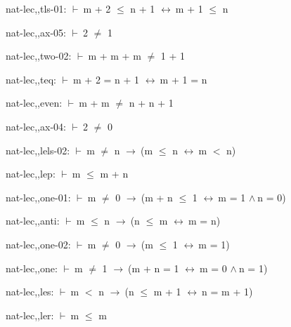 \documentclass[a4paper]{article}
\newcommand{\Fol}{\mbox{$\vdash\ $}}
\newcommand{\And}{\mbox{$\wedge\ $}}
\newcommand{\Imp}{\mbox{$\rightarrow\ $}}
\newcommand{\Equiv}{\mbox{$\leftrightarrow\ $}}
\begin{document}
nat-lec,,tls-01: 
 \Fol m + 2 $\le$ n + 1 \Equiv m + 1 $\le$ n



\bigskip

nat-lec,,ax-05: 
 \Fol 2 $\neq$ 1



\bigskip

nat-lec,,two-02: 
 \Fol m + m + m $\neq$ 1 + 1



\bigskip

nat-lec,,teq: 
 \Fol m + 2 = n + 1 \Equiv m + 1 = n



\bigskip

nat-lec,,even: 
 \Fol m + m $\neq$ n + n + 1



\bigskip

nat-lec,,ax-04: 
 \Fol 2 $\neq$ 0



\bigskip

nat-lec,,lels-02: 
 \Fol m $\neq$ n \Imp (m $\le$ n \Equiv m $<$ n)



\bigskip

nat-lec,,lep: 
 \Fol m $\le$ m + n



\bigskip

nat-lec,,one-01: 
 \Fol m $\neq$ 0 \Imp (m + n $\le$ 1 \Equiv m = 1 \And n = 0)



\bigskip

nat-lec,,anti: 
 \Fol m $\le$ n \Imp (n $\le$ m \Equiv m = n)



\bigskip

nat-lec,,one-02: 
 \Fol m $\neq$ 0 \Imp (m $\le$ 1 \Equiv m = 1)



\bigskip

nat-lec,,one: 
 \Fol m $\neq$ 1 \Imp (m + n = 1 \Equiv m = 0 \And n = 1)



\bigskip

nat-lec,,les: 
 \Fol m $<$ n \Imp (n $\le$ m + 1 \Equiv n = m + 1)



\bigskip

nat-lec,,ler: 
 \Fol m $\le$ m



\bigskip
\end{document}
